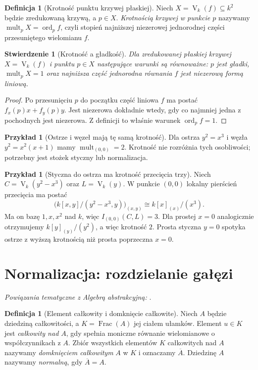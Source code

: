 \documentclass[11pt,a4paper,openany]{report}
\numberwithin{equation}{section}
\theoremstyle{plain}
\newtheorem{stwierdzenie}[twierdzenie]{Stwierdzenie}
\theoremstyle{definition}
\newtheorem{definicja}[twierdzenie]{Definicja}
\newtheorem{przyklad}[twierdzenie]{Przykład}
\theoremstyle{remark}
\newcommand{\V}{\operatorname V}
\newcommand{\Frac}{\operatorname{Frac}}
\begin{document}
\begin{definicja}[Krotność punktu krzywej płaskiej]
Niech $X=\V_k(f)\subseteq k^2$ będzie zredukowaną krzywą,
a $p\in X$. \emph{Krotnością krzywej w punkcie $p$}
nazywamy $\operatorname{mult}_pX=\operatorname{ord}_pf$,
czyli stopień najniższej niezerowej jednorodnej części
przesuniętego wielomianu $f$.
\end{definicja}

\begin{stwierdzenie}[Krotność a gładkość]
Dla zredukowanej płaskiej krzywej $X=\V_k(f)$
i punktu $p\in X$ następujące warunki są równoważne:
$p$ jest gładki, $\operatorname{mult}_pX=1$ oraz
najniższa część jednorodna równania $f$ jest niezerową
formą liniową.
\end{stwierdzenie}
\begin{proof}
Po przesunięciu $p$ do początku część liniowa $f$
ma postać $f_x(p)x+f_y(p)y$. Jest niezerowa dokładnie wtedy,
gdy co najmniej jedna z pochodnych jest niezerowa.
Z definicji to właśnie warunek $\operatorname{ord}_pf=1$.
\end{proof}

\begin{przyklad}[Ostrze i węzeł mają tę samą krotność]
Dla ostrza $y^2=x^3$ i węzła $y^2=x^2(x+1)$
mamy $\operatorname{mult}_{(0,0)}=2$.
Krotność nie rozróżnia tych osobliwości; potrzebny jest
stożek styczny lub normalizacja.
\end{przyklad}

\begin{przyklad}[Styczna do ostrza ma krotność przecięcia trzy]
Niech $C=\V_k(y^2-x^3)$ oraz $L=\V_k(y)$.
W punkcie $(0,0)$ lokalny pierścień przecięcia ma postać
\[
 \bigl(k[x,y]/(y^2-x^3,y)\bigr)_{(x,y)}
 \cong k[x]_{(x)}/(x^3).
\]
Ma on bazę $1,x,x^2$ nad $k$, więc
$I_{(0,0)}(C,L)=3$. Dla prostej $x=0$ analogicznie
otrzymujemy $k[y]_{(y)}/(y^2)$, a więc krotność $2$.
Prosta styczna $y=0$ spotyka ostrze z wyższą krotnością
niż prosta poprzeczna $x=0$.
\end{przyklad}

\section{Normalizacja: rozdzielanie gałęzi}

\noindent\emph{Powiązania tematyczne z Algebrą abstrakcyjną:} .


\begin{definicja}[Element całkowity i domknięcie całkowite]
Niech $A$ będzie dziedziną całkowitości, a
$K=\Frac(A)$ jej ciałem ułamków. Element $u\in K$
jest \emph{całkowity nad $A$}, gdy spełnia moniczne
równanie wielomianowe o współczynnikach z $A$.
Zbiór wszystkich elementów $K$ całkowitych nad $A$
nazywamy \emph{domknięciem całkowitym} $A$ w $K$
i oznaczamy $\overline A$. Dziedzinę $A$ nazywamy
\emph{normalną}, gdy $\overline A=A$.
\end{definicja}
\end{document}
